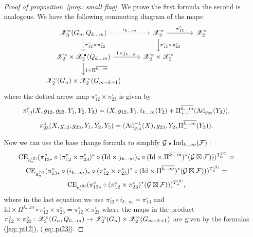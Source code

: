 \begin{proof}[Proof of proposition~\ref{prop: small flag}]
We prove the first formula the second is analogous.
We have the following commuting diagram of the maps:
  $$ \begin{tikzcd}
 \calX_3^{\circ}(G_n,Q_{k\dots m}) \arrow[dotted]{r}{i_{k\dots m}}\arrow[dotted]{d}{\pi_{12}^\circ\times\pi_{23}^\circ}   & \calX^\circ_3\arrow{d}{\pi_{12}^\circ\times\pi_{23}^\circ}\arrow{r}{\pi_{13}^{\circ}}&\calX^\circ_2\\
\calX_2^\circ\times \calX_2^\bullet(Q_{k\dots m}) \arrow{r}{1\times j_{k\dots m}}\arrow{d}{1\times\Pi^{\overline{k\dots m}}} &                                  \calX^\circ_2\times\calX^\circ_2&\\
\calX^\circ_2(G_n)\times\calX^\circ_2(G_{m-k+1})&&
 \end{tikzcd}$$
where the dotted arrow map $\pi_{12}^\circ\times\pi_{23}^\circ$ is given by
$$ \pi_{12}^{\circ}(X,g_{12},g_{23},Y_1,Y_2,Y_3)=(X,g_{12},Y_1,i_{k\dots m}(Y_2)+\Pi_{++}^{\overline{k\dots m}}({\rm Ad}_{g_{23}}(Y_3)),$$
$$\pi_{23}^{\circ}(X,g_{12},g_{23},Y_1,Y_2,Y_3)=({\rm Ad}_{g_{12}}^{-1}(X),g_{23},Y_2,\Pi_{-}^{\overline{k\dots m}}(Y_3)).$$

Now we can use the base change formula to simplify \( \mathcal{G}\star\mathrm{Ind}_{k\dots m}(\mathcal{F})\) :
\begin{multline*}
\mathrm{CE}_{\mathfrak{n}_n^{(2)}}(\pi^\circ_{13*}\circ (\pi^\circ_{12}\times \pi_{23}^\circ)^*\circ (\mathrm{Id}\times j_{k\dots m})_*\circ (\mathrm{Id}\times\Pi^{\overline{k\dots m}})^*(\mathcal{G}\boxtimes \mathcal{F})))^{T^{(2)}_n}=\\
 \mathrm{CE}_{\mathfrak{n}_n^{(2)}}(\pi^\circ_{13*} \circ  (i_{k\dots m})_*\circ  (\pi^\circ_{12}\times \pi_{23}^\circ)^* \circ(\mathrm{Id}\times\Pi^{\overline{k\dots m}})^*(\mathcal{G}\boxtimes \mathcal{F})))^{T^{(2)}_n}=\\
  \mathrm{CE}_{\mathfrak{n}_n^{(2)}}(\pi^\circ_{13*}\circ (\pi^\circ_{12}\times \pi_{23}^\circ)^*(\mathcal{G}\boxtimes \mathcal{F})))^{T^{(2)}_n},
\end{multline*}
where in the last equation we use $ \pi^\circ_{13}\circ i_{k\dots m}=\pi_{13}^\circ$ and
 $\mathrm{Id}\times\Pi^{\overline{k\dots m}}\circ \pi^\circ_{12}\times \pi_{23}^\circ=\pi^\circ_{12}\times \pi_{23}^\circ$ where the maps in the product
$\pi^\circ_{12}\times \pi_{23}^\circ: \mathscr{X}_3^\circ(G_n,Q_{k\dots m})\to \mathscr{X}^\circ_2(G_n)\times\mathscr{X}^\circ_2(G_{m-k+1})$ are given by the formulas (\ref{eq: pi12}), (\ref{eq: pi23}).


\end{proof}
